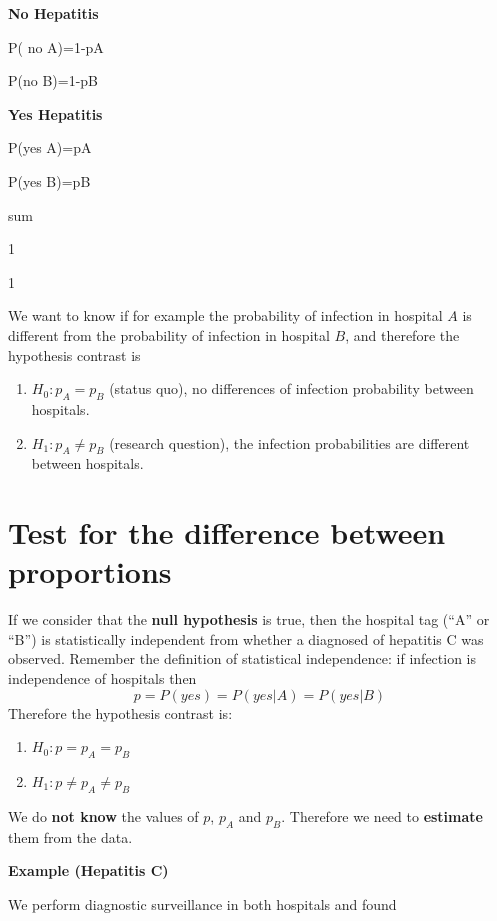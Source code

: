 \documentclass[
]{book}
\providecommand{\tightlist}{%
  \setlength{\itemsep}{0pt}\setlength{\parskip}{0pt}}
\begin{document}
\textbf{No Hepatitis}

P( no {\textbar{}} A)=1-pA

P(no {\textbar{}} B)=1-pB

\textbf{Yes Hepatitis}

P(yes {\textbar{}} A)=pA

P(yes {\textbar{}} B)=pB

sum

1

1

We want to know if for example the probability of infection in hospital \(A\) is different from the probability of infection in hospital \(B\), and therefore the hypothesis contrast is

\begin{enumerate}
\def\labelenumi{\alph{enumi}.}
\tightlist
\item
  \(H_0: p_A=p_B\) (status quo), no differences of infection probability between hospitals.
\item
  \(H_1: p_A\neq p_B\) (research question), the infection probabilities are different between hospitals.
\end{enumerate}

\hypertarget{test-for-the-difference-between-proportions}{%
\section{Test for the difference between proportions}\label{test-for-the-difference-between-proportions}}

If we consider that the \textbf{null hypothesis} is true, then the hospital tag (``A'' or ``B'') is statistically independent from whether a diagnosed of hepatitis C was observed. Remember the definition of statistical independence: if infection is independence of hospitals then
\[p=P(yes)=P(yes|A)=P(yes|B)\]
Therefore the hypothesis contrast is:

\begin{enumerate}
\def\labelenumi{\alph{enumi}.}
\tightlist
\item
  \(H_0: p=p_A=p_B\)
\item
  \(H_1: p\neq p_A \neq p_B\)
\end{enumerate}

We do \textbf{not know} the values of \(p\), \(p_A\) and \(p_B\). Therefore we need to \textbf{estimate} them from the data.

\textbf{Example (Hepatitis C)}

We perform diagnostic surveillance in both hospitals and found
\end{document}
